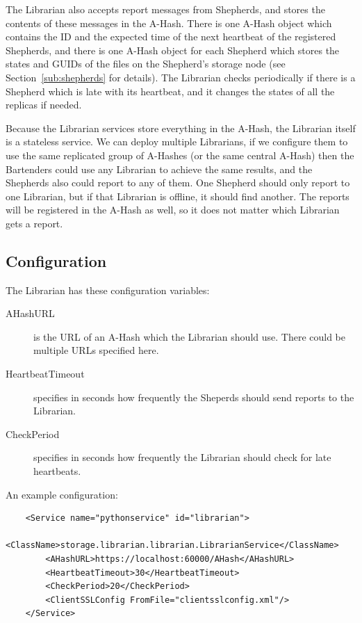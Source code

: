 \documentclass{book}
\begin{document}
The Librarian also accepts report messages from Shepherds, and stores the contents of these messages in the A-Hash. There is one A-Hash object which contains the ID and the expected time of the next heartbeat of the registered Shepherds, and there is one A-Hash object for each Shepherd which stores the states and GUIDs of the files on the Shepherd's storage node (see Section~\ref{sub:shepherds} for details). The Librarian checks periodically if there is a Shepherd which is late with its heartbeat, and it changes the states of all the replicas if needed.

Because the Librarian services store everything in the A-Hash, the Librarian itself is a stateless service. We can deploy multiple Librarians, if we configure them to use the same replicated group of A-Hashes (or the same central A-Hash) then the Bartenders could use any Librarian to achieve the same results, and the Shepherds also could report to any of them. One Shepherd should only report to one Librarian, but if that Librarian is offline, it should find another. The reports will be registered in the A-Hash as well, so it does not matter which Librarian gets a report.


\subsection{Configuration} %

The Librarian has these configuration variables:

\begin{description}
    \item[AHashURL] is the URL of an A-Hash which the Librarian should use. There could be multiple URLs specified here.
    \item[HeartbeatTimeout] specifies in seconds how frequently the Sheperds should send reports to the Librarian.
    \item[CheckPeriod] specifies in seconds how frequently the Librarian should check for late heartbeats.
\end{description}

An example configuration:

\begin{verbatim}
    <Service name="pythonservice" id="librarian">
        <ClassName>storage.librarian.librarian.LibrarianService</ClassName>
        <AHashURL>https://localhost:60000/AHash</AHashURL>
        <HeartbeatTimeout>30</HeartbeatTimeout>
        <CheckPeriod>20</CheckPeriod>
        <ClientSSLConfig FromFile="clientsslconfig.xml"/>
    </Service>
\end{verbatim}
\end{document}
